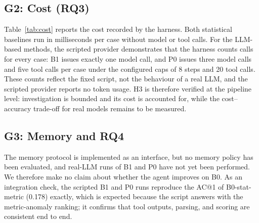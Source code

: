 \documentclass[conference]{IEEEtran}
\begin{document}
\subsection{G2: Cost (RQ3)}
Table~\ref{tab:cost} reports the cost recorded by the harness. Both statistical baselines run in milliseconds per case without model or tool calls. For the LLM-based methods, the scripted provider demonstrates that the harness counts calls for every case: B1 issues exactly one model call, and P0 issues three model calls and five tool calls per case under the configured caps of 8 steps and 20 tool calls. These counts reflect the fixed script, not the behaviour of a real LLM, and the scripted provider reports no token usage. H3 is therefore verified at the pipeline level: investigation is bounded and its cost is accounted for, while the cost--accuracy trade-off for real models remains to be measured.

\begin{table}[t]
\centering
\caption{Mean per-incident cost recorded by the harness. Rows marked $\dagger$ use the scripted provider and validate accounting only.}
\label{tab:cost}
\footnotesize
\setlength{\tabcolsep}{4pt}
\end{table}

\subsection{G3: Memory and RQ4}
The memory protocol is implemented as an interface, but no memory policy has been evaluated, and real-LLM runs of B1 and P0 have not yet been performed. We therefore make no claim about whether the agent improves on B0. As an integration check, the scripted B1 and P0 runs reproduce the AC@1 of B0-stat-metric (0.178) exactly, which is expected because the script answers with the metric-anomaly ranking; it confirms that tool outputs, parsing, and scoring are consistent end to end.
\end{document}
